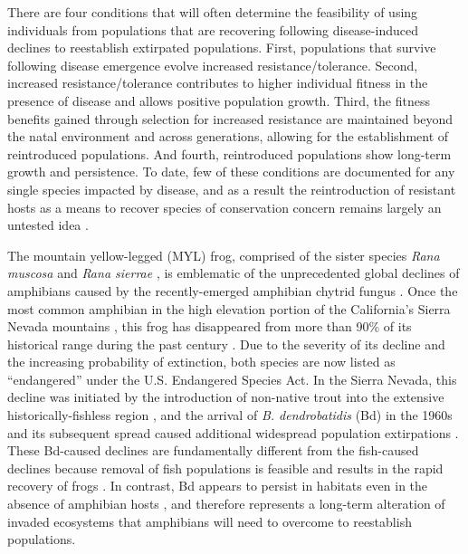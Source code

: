 \documentclass[9pt,twocolumn,twoside,lineno]{pnas-new}
\begin{document}
There are four conditions that will often determine the feasibility of
using individuals from populations that are recovering following
disease-induced declines to reestablish extirpated populations. First,
populations that survive following disease emergence evolve increased
resistance/tolerance. Second, increased resistance/tolerance contributes
to higher individual fitness in the presence of disease and allows
positive population growth. Third, the fitness benefits gained through
selection for increased resistance are maintained beyond the natal
environment and across generations, allowing for the establishment of
reintroduced populations. And fourth, reintroduced populations show
long-term growth and persistence. To date, few of these conditions are
documented for any single species impacted by disease, and as a result
the reintroduction of resistant hosts as a means to recover species of
conservation concern remains largely an untested idea
\citep{scheele2021, mendelson2019}.

The mountain yellow-legged (MYL) frog, comprised of the sister species
\emph{Rana muscosa} and \emph{Rana sierrae} \citep{vredenburg2007}, is
emblematic of the unprecedented global declines of amphibians caused by
the recently-emerged amphibian chytrid fungus
\citep[\emph{Batrachochytrium dendrobatidis,}][]{scheele2019}. Once the
most common amphibian in the high elevation portion of the California's
Sierra Nevada mountains \citep[USA,][]{grinnell1924}, this frog has
disappeared from more than 90\% of its historical range during the past
century \citep{vredenburg2007}. Due to the severity of its decline and
the increasing probability of extinction, both species are now listed as
``endangered'' under the U.S. Endangered Species Act. In the Sierra
Nevada, this decline was initiated by the introduction of non-native
trout into the extensive historically-fishless region
\citep{bradford1989, knapp2000}, and the arrival of \emph{B.
dendrobatidis} (Bd) in the 1960s and its subsequent spread
\citep{vredenburg2019} caused additional widespread population
extirpations \citep{vredenburg2010, rachowicz2006}. These Bd-caused
declines are fundamentally different from the fish-caused declines
because removal of fish populations is feasible and results in the rapid
recovery of frogs \citep{knapp2007, vredenburg2004}. In contrast, Bd
appears to persist in habitats even in the absence of amphibian hosts
\citep{walker2007}, and therefore represents a long-term alteration of
invaded ecosystems that amphibians will need to overcome to reestablish
populations.
\end{document}
